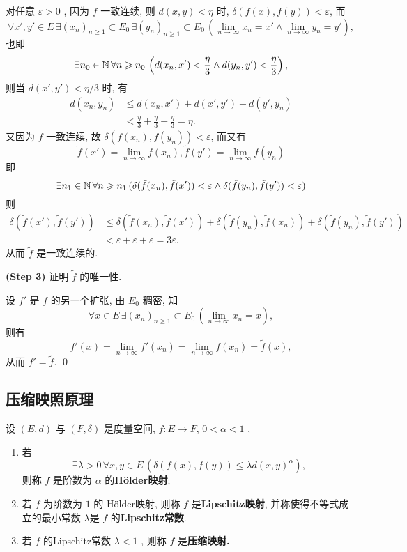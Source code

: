 \begin{Proof}
		对任意 $ \varepsilon>0 $ , 因为 $ f $ 一致连续, 则 $ d(x, y)<\eta $ 时, $ \delta(f(x), f(y))<\varepsilon $, 而
		\[
			\forall x', y'\in E\,\exists  (x_{n})_{n\geqslant1}\subset E_{0} \,\exists  (y_{n})_{n\geqslant1}\subset E_{0} \,(\lim_{n\to\infty}x_{n}=x'\land \lim_{n\to\infty}y_{n}=y' ),
		\]
		也即
		\[
			\exists n_{0}\in\mathbb{N}\,\forall n\geqslant n_{0}\,\left(d(x_{n}, x')<\frac{\eta}{3}\land d(y_{n}, y')<\frac{\eta}{3}\right),
		\]
		则当 $ d(x', y')<\eta/3 $ 时, 有
		\[
			\begin{aligned}
				d(x_{n}, y_{n}) & \leqslant d(x_{n}, x')+d(x', y')+d(y', y_{n})\\
				& < \frac{\eta}{3}+\frac{\eta}{3}+\frac{\eta}{3}=\eta.
			\end{aligned}
		\]
		又因为 $ f $ 一致连续, 故 $ \delta(f(x_{n}), f(y_{n}))<\varepsilon $, 而又有
		\[
			\tilde{f}(x')=\lim_{n\to\infty}f(x_{n}), \tilde{f}(y')=\lim_{n\to\infty}f(y_{n})
		\]
		即
		\[
			\exists n_{1}\in\mathbb{N}\,\forall n\geqslant n_{1}\,(\delta(\tilde{f}(x_{n}), \tilde{f}(x'))<\varepsilon\land \delta(\tilde{f}(y_{n}), \tilde{f}(y'))<\varepsilon)
		\]
		则
		\[
			\begin{aligned}
				\delta(\tilde{f}(x'), \tilde{f}(y')) & \leqslant \delta(\tilde{f}(x_{n}), \tilde{f}(x'))+\delta(\tilde{f}(y_{n}), \tilde{f}(x_{n}))+\delta(\tilde{f}(y_{n}), \tilde{f}(y'))\\
				& <\varepsilon+\varepsilon+\varepsilon=3\varepsilon.
			\end{aligned}
		\]
		从而 $ \tilde{f} $ 是一致连续的.

		\textbf{(Step 3)} 证明 $ \tilde{f} $ 的唯一性.


		设 $ {f}' $ 是 $ f $ 的另一个扩张, 由 $ E_{0} $ 稠密, 知
		\[
			\forall x\in E\,\exists (x_{n})_{n\geqslant1} \subset E_{0}\,(\lim_{n\to\infty}x_{n}=x),
		\]
		则有
		\[
			f'(x)=\lim_{n\to\infty}f'(x_{n})=\lim_{n\to\infty}f(x_{n})=\tilde{f}(x),
		\]
		从而 $ f'=\tilde{f} $. \qed
	\end{Proof}

	\subsection{压缩映照原理}

	\begin{Definition}[H\"older映射]\label{def:H\"older映射}
		设 $ (E, d) $ 与 $ (F, \delta) $ 是度量空间,  $ f:E\to F $, $ 0<\alpha<1 $ ,
		\begin{enumerate}[(1)]
			\item 若
			\[
				\exists \lambda>0\,\forall x, y\in E\,(\delta(f(x), f(y))\leqslant\lambda d(x, y)^{\alpha}),
			\]
			则称 $ f $ 是阶数为 $ \alpha $ 的\textbf{H\"older映射};
			\item 若 $ f $ 为阶数为 $ 1 $ 的 H\"older映射, 则称 $ f $ 是\textbf{Lipschitz映射}, 并称使得不等式成立的最小常数 $ \lambda $是 $ f $ 的\textbf{Lipschitz常数}.
			\item 若 $ f $ 的Lipschitz常数 $ \lambda<1 $ , 则称 $ f $ 是\textbf{压缩映射.}
		\end{enumerate}
	\end{Definition}

